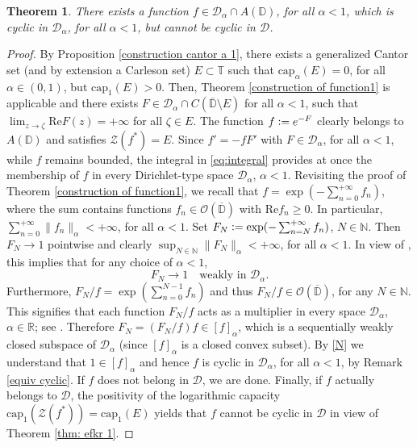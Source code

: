 \documentclass[12pt]{amsart}
\newtheorem{theorem}{Theorem}[section]
\theoremstyle{definition}\newtheorem{remark}[theorem]{Remark}
\theoremstyle{definition}\newtheorem{example}[theorem]{Example}
\theoremstyle{definition}\newtheorem{definition}{Definition}
\numberwithin{equation}{section}
\newcommand\cD{{\mathcal D}}
\newcommand\RR{{\mathbb R}}
\newcommand\DD{{\mathbb D}}
\newcommand\TT{{\mathbb T}}
\begin{document}
\begin{theorem}\label{thm:second construction}
    There exists a function $f\in\cD_\alpha\cap A(\DD)$, for all $\alpha<1$, which is cyclic in $\cD_\alpha$, for all $\alpha<1$, but cannot be cyclic in $\cD$.
\end{theorem}
\begin{proof}
    By Proposition \ref{construction cantor a 1}, there exists a generalized Cantor set (and by extension a Carleson set) $E\subset\TT$ such that $\mathrm{cap}_\alpha(E)=0$, for all $\alpha\in (0,1)$, but $\mathrm{cap}_1(E)>0$. Then, Theorem \ref{construction of function1} is applicable and there exists $F\in \cD_\alpha\cap C(\overline{\DD}\setminus E)$ for all $\alpha<1$, such that $\lim_{z\rightarrow \zeta}\mathrm{Re}F(z)=+\infty$ for all $\zeta\in E$. The function $f\vcentcolon=e^{-F}$ clearly belongs to $A(\DD)$ and satisfies $\mathcal{Z}(f^*)=E$. Since $f'=-fF'$ with $F\in\cD_\alpha$, for all $\alpha<1$, while $f$ remains bounded, the integral in \eqref{eq:integral} provides at once the membership of $f$ in every Dirichlet-type space $\cD_\alpha$, $\alpha<1$. Revisiting the proof of Theorem \ref{construction of function1}, we recall that $f=\exp(-\sum_{n=0}^{+\infty}f_n)$, where the sum contains functions $f_n\in\mathcal{O}(\overline{\DD})$ with $\mathrm{Re}f_n\ge0$. In particular, $\sum_{n=0}^{+\infty}\|f_n\|_\alpha<+\infty$, for all $\alpha<1$. Set $F_N\vcentcolon=\exp(-\sum_{n=N}^{+\infty}f_n)$, $N\in\mathbb{N}$. Then $F_N\to 1$ pointwise and clearly $\sup_{N\in\mathbb{N}}\|F_N\|_\alpha<+\infty$, for all $\alpha<1$. In view of \cite[p.272]{Brown-Shields}, this implies that for any choice of $\alpha<1$,
    \begin{equation}\label{N}
    F_N\rightarrow1 \quad  \text{weakly in }\cD_\alpha.
    \end{equation}
    Furthermore, $F_N/f=\exp(\sum_{n=0}^{N-1}f_n)$ and thus $F_N/f\in\mathcal{O}(\overline{\DD})$, for any $N\in\mathbb{N}$. This signifies that each function $F_N/f$ acts as a multiplier in every space $\cD_\alpha$, $\alpha\in \RR$; see \cite[p.273]{Brown-Shields}. Therefore $F_N=(F_N/f)f\in[f]_\alpha$, which is a sequentially weakly closed subspace of $\cD_\alpha$ (since $[f]_\alpha$ is a closed convex subset). By \eqref{N} we understand that $1\in[f]_\alpha$ and hence $f$ is cyclic in $\cD_\alpha$, for all $\alpha<1$, by Remark \ref{equiv cyclic}. If $f$ does not belong in $\cD$, we are done. Finally, if $f$ actually belongs to $\cD$, the positivity of the logarithmic capacity $\mathrm{cap}_1(\mathcal{Z}(f^*))=\mathrm{cap}_1(E)$ yields that $f$ cannot be cyclic in $\cD$ in view of Theorem \ref{thm: efkr 1}.
\end{proof}
\end{document}
